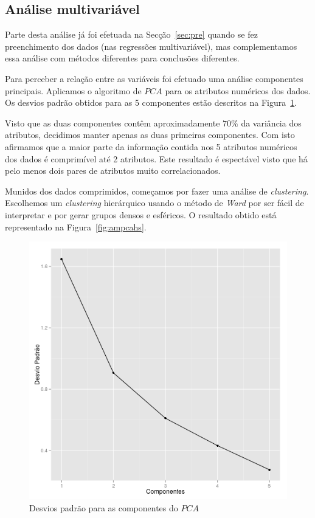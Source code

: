\documentclass[10pt, conference, compsocconf]{IEEEtran}
\begin{document}
\subsection{Análise multivariável}
Parte desta análise já foi efetuada na Secção~\ref{sec:pre} quando se
fez preenchimento dos dados (nas regressões multivariável), mas
complementamos essa análise com métodos diferentes para conclusões
diferentes.

Para perceber a relação entre as variáveis foi efetuado uma análise
componentes principais. Aplicamos o algoritmo de $PCA$ para os
atributos numéricos dos dados. Os desvios padrão obtidos para as 5
componentes estão descritos na Figura~\ref{fig:ampca}.

Visto que as duas componentes contêm aproximadamente $70\%$ da
variância dos atributos, decidimos manter apenas as duas primeiras
componentes. Com isto afirmamos que a maior parte da informação
contida nos 5 atributos numéricos dos dados é comprimível até 2
atributos. Este resultado é espectável visto que há pelo menos dois
pares de atributos muito correlacionados.

Munidos dos dados comprimidos, começamos por fazer uma análise de
\textit{clustering}. Escolhemos um \textit{clustering} hierárquico
usando o método de \textit{Ward} por ser fácil de interpretar e por
gerar grupos densos e esféricos. O resultado obtido está representado
na Figura~\ref{fig:ampcahs}.

\begin{figure}[H]
  \centering
  \includegraphics[scale=0.4]{img/amv_pcasd.png}
  \caption{Desvios padrão para as componentes do $PCA$}
  \label{fig:ampca}
\end{figure}
\end{document}

